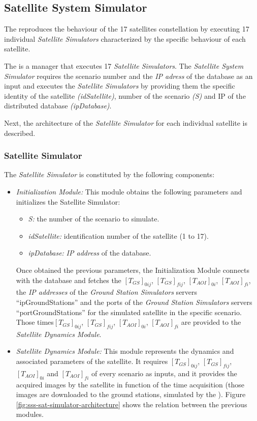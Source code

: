 \subsection{Satellite System Simulator}

The \satss reproduces the behaviour of the 17 satellites constellation by executing 17 individual \emph{Satellite Simulators} characterized by the specific behaviour of each satellite.

The \satss is a manager that executes 17 \emph{Satellite Simulators}. The
\emph{Satellite System Simulator} requires the scenario number and the \emph{IP adress} of the database as an input and executes the \emph{Satellite Simulators} by providing them the specific identity of the satellite \emph{(idSatellite)}, number of the scenario \emph{(S)} and IP of the distributed database  \emph{(ipDatabase)}.

Next, the architecture of the \emph{Satellite Simulator} for each individual
satellite is described.


\subsubsection{Satellite Simulator}

The \emph{Satellite Simulator} is constituted by the following components:
\begin{itemize}
\item \emph{Initialization Module:} This module obtains the following parameters
  and initializes the Satellite Simulator:
\begin{itemize}
\item \emph{S:} the number of the scenario to simulate.
\item \emph{idSatellite:} identification number of the satellite (1 to 17).
\item \emph{ipDatabase:} \emph{IP address} of the database.
\end{itemize}
Once obtained the previous parameters, the Initialization Module connects with the database and fetches the $[T_{GS}]_{0ij}$, $[T_{GS}]_{fij}$,  $[T_{AOI}]_{0i}$, $[T_{AOI}]_{fi}$, the \emph{IP addresses} of the \emph{Ground Station Simulators} servers “ipGroundStations” and  the ports of the \emph{Ground Station Simulators} servers “portGroundStations” for the simulated satellite in the specific scenario. Those times$[T_{GS}]_{0ij}$, $[T_{GS}]_{fij}$, $[T_{AOI}]_{0i}$, $[T_{AOI}]_{fi}$ are provided to the \emph{Satellite Dynamics Module}.

\item \emph{Satellite Dynamics Module:} This module represents the dynamics and
  associated parameters of the satellite. It requires $[T_{GS}]_{0ij}$, $[T_{GS}]_{fij}$,  $[T_{AOI}]_{0i}$ and $[T_{AOI}]_{fi}$ of every scenario as inputs, and it provides the acquired images by the satellite in function of the time acquisition (those images are downloaded to the ground stations, simulated by the \gsss).
Figure \ref{fig:sss-sat-simulator-architecture} shows the relation between the previous modules.
\end{itemize}


